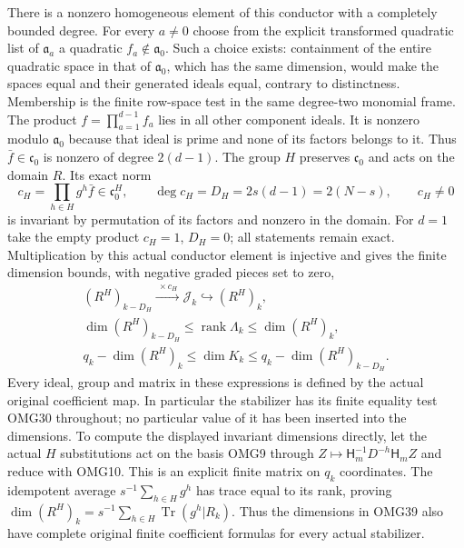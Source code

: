 \documentclass[11pt,a4paper]{article}
\begin{document}
There is a nonzero homogeneous element of this conductor with a
completely bounded degree. For every $a\ne0$ choose from the
explicit transformed quadratic list of $\mathfrak a_a$ a quadratic
$f_a\notin\mathfrak a_0$. Such a choice exists: containment of
the entire quadratic space in that of $\mathfrak a_0$, which has
the same dimension, would make the spaces equal and their
generated ideals equal, contrary to distinctness. Membership is
the finite row-space test in the same degree-two monomial frame.
The product $f=\prod_{a=1}^{d-1}f_a$ lies in all other component
ideals. It is nonzero modulo $\mathfrak a_0$ because that ideal is
prime and none of its factors belongs to it. Thus
$\bar f\in\mathfrak c_0$ is nonzero of degree $2(d-1)$.
The group $H$ preserves $\mathfrak c_0$ and acts on the domain
$R$. Its exact norm
\[
 c_H=\prod_{h\in H}g^h\bar f\in\mathfrak c_0^H,\qquad
 \deg c_H=D_H=2s(d-1)=2(N-s),\qquad c_H\ne0
 \tag{OMG38}
\]
is invariant by permutation of its factors and nonzero in the
domain. For $d=1$ take the empty product $c_H=1$, $D_H=0$;
all statements remain exact. Multiplication by this actual
conductor element is injective and gives the finite dimension
bounds, with negative graded pieces set to zero,
\[
\boxed{\begin{gathered}
 (R^H)_{k-D_H}\xrightarrow{\ \times c_H\ }\mathscr J_k
                    \hookrightarrow(R^H)_k,\\
 \dim(R^H)_{k-D_H}\le\operatorname{rank}\Lambda_k
                                  \le\dim(R^H)_k,\\
 q_k-\dim(R^H)_k\le\dim K_k
                                  \le q_k-\dim(R^H)_{k-D_H}.
\end{gathered}}\tag{OMG39}
\]
Every ideal, group and matrix in these expressions is defined by
the actual original coefficient map. In particular the stabilizer
has its finite equality test OMG30 throughout; no particular value
of it has been inserted into the dimensions. To compute the displayed
invariant dimensions directly, let the actual $H$ substitutions act
on the basis OMG9 through $Z\mapsto\mathsf H_m^{-1}D^{-h}\mathsf H_mZ$
and reduce with OMG10. This is an explicit finite matrix on $q_k$
coordinates. The idempotent average $s^{-1}\sum_{h\in H}g^h$ has
trace equal to its rank, proving
$\dim(R^H)_k=s^{-1}\sum_{h\in H}\operatorname{Tr}(g^h|R_k)$.
Thus the dimensions in OMG39 also have complete original finite
coefficient formulas for every actual stabilizer.
\end{document}
